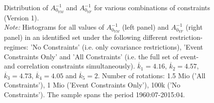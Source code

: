 \documentclass[a4paper,11pt,listof=nochaptergap,oneside,pointednumbers,bibtotoc,bigheadings,liststotoc,hidelinks]{scrbook}
\theoremstyle{mysatz}
\theoremstyle{mydefinition}
\theoremstyle{mytheorem}
\theoremstyle{mybemerkung}
\begin{document}
\begin{figure}[!h]
   \centering
   \setlength\fboxsep{0pt}
   \setlength\fboxrule{0pt}
      \caption[Distribution of $A_{0_{YM}}^{-1}$ and $A_{0_{YF}}^{-1}$ for various combinations of constraints (Version 1).]{Distribution of $A_{0_{YM}}^{-1}$ and $A_{0_{YF}}^{-1}$ for various combinations of constraints (Version 1).\\
      \textit{Note:} Histograms for all values of $A_{0_{YM}}^{-1}$ (left panel) and $A_{0_{YF}}^{-1}$ (right panel) in an identified set under the following different restriction-regimes: 'No Constraints' (i.e. only covariance restrictions), 'Event Constraints Only' and 'All Constraints' (i.e. the full set of event- and correlation constraints simultaneously). $\overline{k}_1 = 4.16$, $\overline{k}_2 = 4.57$, $\overline{k}_3 = 4.73$, $\overline{k}_4 = 4.05$ and $\overline{k}_5 = 2$. Number of rotations: 1.5 Mio ('All Constraints'), 1 Mio ('Event Constraints Only'), 100k ('No Constraints'). The sample spans the period 1960:07-2015:04.}   \label{fig:distribution_impact_matrices_type1}
\end{figure}
\end{document}
